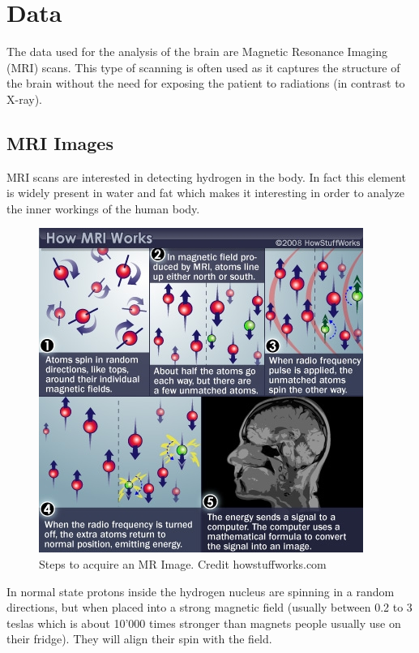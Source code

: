 \chapter{Data}
The data used for the analysis of the brain are Magnetic Resonance Imaging (MRI) scans. This type of scanning is often used as it captures the structure of the brain without the need for exposing the patient to radiations (in contrast to X-ray).  

\section{MRI Images}

MRI scans are interested in detecting hydrogen in the body. In fact this element is widely present in water and fat which makes it interesting in order to analyze the inner workings of the human body.
\begin{figure}
 \centering
 \includegraphics[width=.9\linewidth]{figures/dataset/mri-steps.jpg}
 \captionsetup{width=.9\linewidth}
 \caption[bla]{Steps to acquire an MR Image. Credit howstuffworks.com\footnotemark}
 \label{fig:IXI_hospital_count}
\end{figure}

In normal state protons inside the hydrogen nucleus are spinning in a random directions, but when placed into a strong magnetic field (usually between 0.2 to 3 teslas which is about 10’000 times stronger than magnets people usually use on their fridge). They will align their spin with the field.

